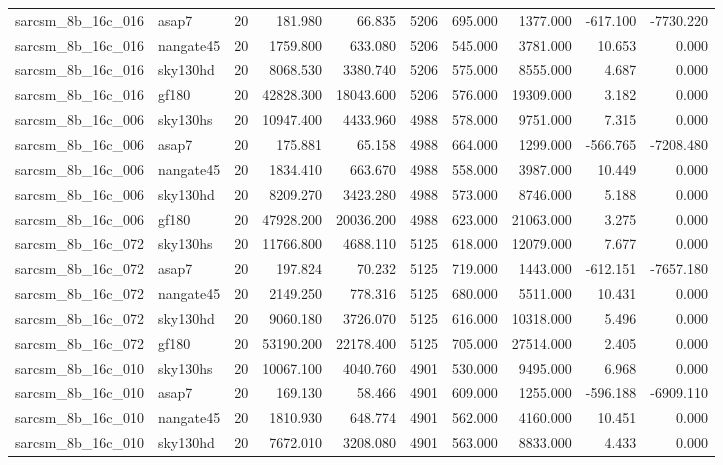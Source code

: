 \documentclass{article}
\begin{document}
\begin{longtable}{llrrrrrrrr}
sarcsm\_8b\_16c\_016 & asap7 & 20 & 181.980 & 66.835 & 5206 & 695.000 & 1377.000 & -617.100 & -7730.220 \\
sarcsm\_8b\_16c\_016 & nangate45 & 20 & 1759.800 & 633.080 & 5206 & 545.000 & 3781.000 & 10.653 & 0.000 \\
sarcsm\_8b\_16c\_016 & sky130hd & 20 & 8068.530 & 3380.740 & 5206 & 575.000 & 8555.000 & 4.687 & 0.000 \\
sarcsm\_8b\_16c\_016 & gf180 & 20 & 42828.300 & 18043.600 & 5206 & 576.000 & 19309.000 & 3.182 & 0.000 \\
sarcsm\_8b\_16c\_006 & sky130hs & 20 & 10947.400 & 4433.960 & 4988 & 578.000 & 9751.000 & 7.315 & 0.000 \\
sarcsm\_8b\_16c\_006 & asap7 & 20 & 175.881 & 65.158 & 4988 & 664.000 & 1299.000 & -566.765 & -7208.480 \\
sarcsm\_8b\_16c\_006 & nangate45 & 20 & 1834.410 & 663.670 & 4988 & 558.000 & 3987.000 & 10.449 & 0.000 \\
sarcsm\_8b\_16c\_006 & sky130hd & 20 & 8209.270 & 3423.280 & 4988 & 573.000 & 8746.000 & 5.188 & 0.000 \\
sarcsm\_8b\_16c\_006 & gf180 & 20 & 47928.200 & 20036.200 & 4988 & 623.000 & 21063.000 & 3.275 & 0.000 \\
sarcsm\_8b\_16c\_072 & sky130hs & 20 & 11766.800 & 4688.110 & 5125 & 618.000 & 12079.000 & 7.677 & 0.000 \\
sarcsm\_8b\_16c\_072 & asap7 & 20 & 197.824 & 70.232 & 5125 & 719.000 & 1443.000 & -612.151 & -7657.180 \\
sarcsm\_8b\_16c\_072 & nangate45 & 20 & 2149.250 & 778.316 & 5125 & 680.000 & 5511.000 & 10.431 & 0.000 \\
sarcsm\_8b\_16c\_072 & sky130hd & 20 & 9060.180 & 3726.070 & 5125 & 616.000 & 10318.000 & 5.496 & 0.000 \\
sarcsm\_8b\_16c\_072 & gf180 & 20 & 53190.200 & 22178.400 & 5125 & 705.000 & 27514.000 & 2.405 & 0.000 \\
sarcsm\_8b\_16c\_010 & sky130hs & 20 & 10067.100 & 4040.760 & 4901 & 530.000 & 9495.000 & 6.968 & 0.000 \\
sarcsm\_8b\_16c\_010 & asap7 & 20 & 169.130 & 58.466 & 4901 & 609.000 & 1255.000 & -596.188 & -6909.110 \\
sarcsm\_8b\_16c\_010 & nangate45 & 20 & 1810.930 & 648.774 & 4901 & 562.000 & 4160.000 & 10.451 & 0.000 \\
sarcsm\_8b\_16c\_010 & sky130hd & 20 & 7672.010 & 3208.080 & 4901 & 563.000 & 8833.000 & 4.433 & 0.000 \\

\end{longtable}
\end{document}
